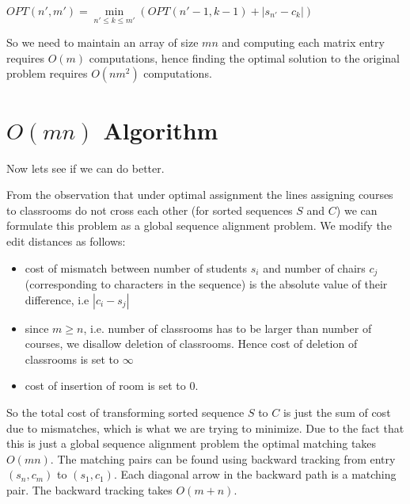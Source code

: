 \begin{center}
  $OPT(n', m') = \min\limits_{n'\leq k \leq m'} (OPT(n'-1, k-1) + |s_{n'} - c_{k}|)$
\end{center}


So we need to maintain an array of size $mn$ and computing each matrix entry requires $O(m)$ computations, hence finding the optimal solution to the original problem requires $O(nm^2)$ computations.

\section{$O(mn)$ Algorithm}

Now lets see if we can do better.

From the observation that under optimal assignment the lines assigning courses to classrooms do not cross each other (for sorted sequences $S$ and $C$) we can formulate this problem as a global sequence alignment problem. We modify the edit distances as follows:

\begin{itemize}
\item cost of mismatch between number of students $s_i$ and number of chairs $c_j$ (corresponding to characters in the sequence) is the absolute value of their difference, i.e $| c_i - s_j |$
\item since $m \geq n$, i.e. number of classrooms has to be larger than number of courses, we disallow deletion of classrooms. Hence cost of deletion of classrooms is set to $\infty$
\item cost of insertion of room is set to 0.   
\end{itemize}

So the total cost of transforming sorted sequence $S$ to $C$ is just the sum of cost due to mismatches, which is what we are trying to minimize. Due to the fact that this is just a global sequence alignment problem the optimal matching takes $O(mn)$. The matching pairs can be found using backward tracking from entry $(s_n, c_m)$ to $(s_1, c_1)$. Each diagonal arrow in the backward path is a matching pair. The backward tracking takes $O(m + n)$.

